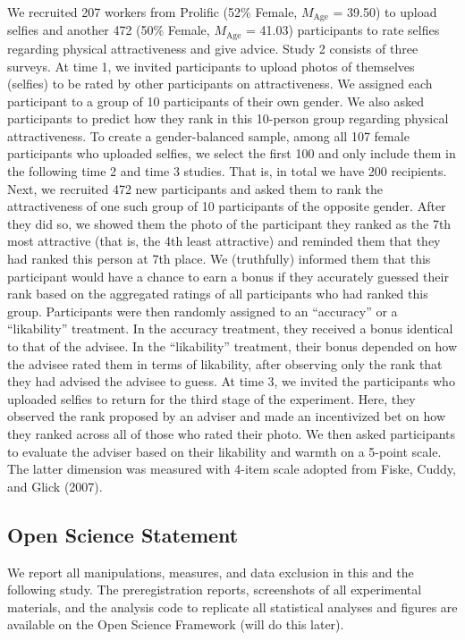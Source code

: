 \documentclass[
  man,floatsintext]{apa6}
\begin{document}
We recruited 207 workers from Prolific (52\% Female, \(M_{\text{Age}}\) = 39.50) to upload selfies and another 472 (50\% Female, \(M_{\text{Age}}\) = 41.03) participants to rate selfies regarding physical attractiveness and give advice.
Study 2 consists of three surveys. At time 1, we invited participants to upload photos of themselves (selfies) to be rated by other participants on attractiveness. We assigned each participant to a group of 10 participants of their own gender. We also asked participants to predict how they rank in this 10-person group regarding physical attractiveness. To create a gender-balanced sample, among all 107 female participants who uploaded selfies, we select the first 100 and only include them in the following time 2 and time 3 studies. That is, in total we have 200 recipients. Next, we recruited 472 new participants and asked them to rank the attractiveness of one such group of 10 participants of the opposite gender. After they did so, we showed them the photo of the participant they ranked as the 7th most attractive (that is, the 4th least attractive) and reminded them that they had ranked this person at 7th place. We (truthfully) informed them that this participant would have a chance to earn a bonus if they accurately guessed their rank based on the aggregated ratings of all participants who had ranked this group. Participants were then randomly assigned to an ``accuracy'' or a ``likability'' treatment. In the accuracy treatment, they received a bonus identical to that of the advisee. In the ``likability'' treatment, their bonus depended on how the advisee rated them in terms of likability, after observing only the rank that they had advised the advisee to guess. At time 3, we invited the participants who uploaded selfies to return for the third stage of the experiment. Here, they observed the rank proposed by an adviser and made an incentivized bet on how they ranked across all of those who rated their photo. We then asked participants to evaluate the adviser based on their likability and warmth on a 5-point scale. The latter dimension was measured with 4-item scale adopted from Fiske, Cuddy, and Glick (2007).

\hypertarget{open-science-statement-1}{%
\subsection{Open Science Statement}\label{open-science-statement-1}}

We report all manipulations, measures, and data exclusion in this and the following study.
The preregistration reports, screenshots of all experimental materials, and
the analysis code to replicate all statistical analyses and figures are
available on the Open Science Framework (will do this later).
\end{document}
